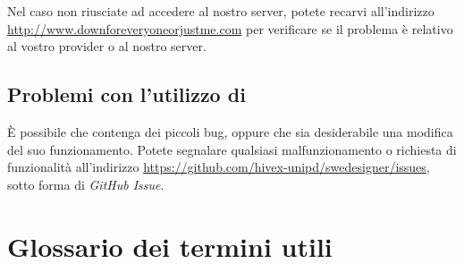 Nel caso non riusciate ad accedere al nostro server, potete recarvi all'indirizzo \url{http://www.downforeveryoneorjustme.com} per verificare se il problema è relativo al vostro provider o al nostro server.



\subsection{Problemi con l'utilizzo di \proj}

È possibile che \proj{} contenga dei piccoli bug, oppure che sia desiderabile una modifica del suo funzionamento. Potete segnalare qualsiasi malfunzionamento o richiesta di funzionalità all'indirizzo \url{https://github.com/hivex-unipd/swedesigner/issues}, sotto forma di \emph{GitHub Issue}.





\appendix


\section{Glossario dei termini utili} \label{app:gloss}

